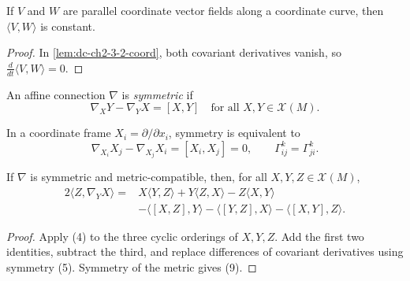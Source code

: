 \begin{lemma}
  \label{lem:dc-ch2-3-1-coord}


  If $V$ and $W$ are parallel coordinate vector fields along a coordinate
  curve, then $\langle V,W\rangle$ is constant.
\end{lemma}
\begin{proof}

  \sketch
  In \cref{lem:dc-ch2-3-2-coord}, both covariant derivatives vanish, so
  $\frac{d}{dt}\langle V,W\rangle=0$.
\end{proof}

\begin{definition}
  \label{def:dc-ch2-3-4}


  An affine connection $\nabla$ is \emph{symmetric} if
  \[
    \nabla_XY-\nabla_YX=[X,Y]
    \quad\text{for all }X,Y\in\mathcal{X}(M).\tag{5}
  \]
\end{definition}

\begin{remark}[Remark 3.5]
  \label{rem:dc-ch2-3-5}


  In a coordinate frame $X_i=\partial/\partial x_i$, symmetry is equivalent to
  \[
    \nabla_{X_i}X_j-\nabla_{X_j}X_i=[X_i,X_j]=0,
    \qquad
    \Gamma_{ij}^k=\Gamma_{ji}^k.\tag{5'}
  \]
\end{remark}

\begin{lemma}
  \label{lem:dc-ch2-3-6-koszul}


  If $\nabla$ is symmetric and metric-compatible, then, for all
  $X,Y,Z\in\mathcal{X}(M)$,
  \[
    \begin{aligned}
    2\langle Z,\nabla_YX\rangle
      ={}&X\langle Y,Z\rangle+Y\langle Z,X\rangle-Z\langle X,Y\rangle\\
       &-\langle[X,Z],Y\rangle-\langle[Y,Z],X\rangle
        -\langle[X,Y],Z\rangle.
    \end{aligned}\tag{9}
  \]
\end{lemma}
\begin{proof}

  \sketch
  Apply (4) to the three cyclic orderings of $X,Y,Z$. Add the first two
  identities, subtract the third, and replace differences of covariant
  derivatives using symmetry (5). Symmetry of the metric gives (9).
\end{proof}

